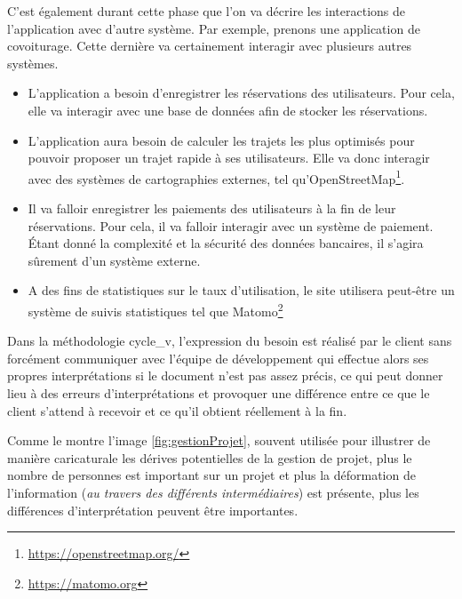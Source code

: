C'est également durant cette phase que l'on va décrire les interactions de l'application avec d'autre système. Par exemple, prenons une application de covoiturage. Cette dernière va certainement interagir avec plusieurs autres systèmes.

\begin{itemize}
	\setlength\itemsep{0em}
	\item L'application a besoin d'enregistrer les réservations des utilisateurs. Pour cela, elle va interagir avec une base de données afin de stocker les réservations.
	\item L'application aura besoin de calculer les trajets les plus optimisés pour pouvoir proposer un trajet rapide à ses utilisateurs. Elle va donc interagir avec des systèmes de cartographies externes, tel qu'OpenStreetMap\footnote{\url{https://openstreetmap.org/}}.
	\item Il va falloir enregistrer les paiements des utilisateurs à la fin de leur réservations. Pour cela, il va falloir interagir avec un système de paiement. Étant donné la complexité et la sécurité des données bancaires, il s'agira sûrement d'un système externe.
	\item A des fins de statistiques sur le taux d'utilisation, le site utilisera peut-être un système de suivis statistiques tel que Matomo\footnote{\url{https://matomo.org}} 
\end{itemize}

Dans la méthodologie \gls{cycle_v}, l'expression du besoin est réalisé par le client sans forcément communiquer avec l'équipe de développement qui effectue alors ses propres interprétations si le document n'est pas assez précis, ce qui peut donner lieu à des erreurs d'interprétations et provoquer une différence entre ce que le client s'attend à recevoir et ce qu'il obtient réellement à la fin.


Comme le montre l'image \ref{fig:gestionProjet}, souvent utilisée pour illustrer de manière caricaturale les dérives potentielles de la gestion de projet, plus le nombre de personnes est important sur un projet et plus la déformation de l'information (\emph{au travers des différents intermédiaires}) est présente, plus les différences d'interprétation peuvent être importantes. 


